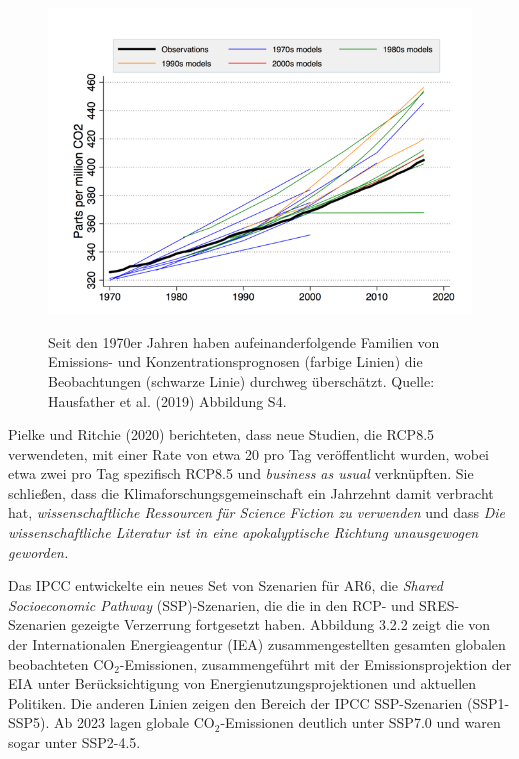 \documentclass[12pt,paper=a4,DIV=12,parskip=never,chapterprefix=false,headings=standardclasses]{scrreprt}
\numberwithin{figure}{chapter}
\begin{document}
\begin{figure}[H]
\begin{center}
\includegraphics[width=1.0\textwidth]{bilder/bilderKlima-0011.png}\\[1cm]
\end{center}
\caption{Seit den 1970er Jahren haben aufeinanderfolgende Familien von Emissions- und Konzentrationsprognosen (farbige
Linien) die Beobachtungen (schwarze Linie) durchweg überschätzt. Quelle: Hausfather et al. (2019)
Abbildung S4.}
\end{figure}

Pielke und Ritchie (2020) berichteten, dass neue Studien, die RCP8.5 verwendeten, mit einer Rate von etwa 20 pro Tag veröffentlicht wurden, wobei etwa zwei pro Tag spezifisch RCP8.5 und \emph{business as usual} verknüpften. Sie schließen, dass die Klimaforschungsgemeinschaft ein Jahrzehnt damit verbracht hat, \emph{wissenschaftliche Ressourcen für Science Fiction zu verwenden} und dass \emph{Die wissenschaftliche Literatur ist in eine apokalyptische Richtung unausgewogen geworden.}

Das IPCC entwickelte ein neues Set von Szenarien für AR6, die \emph{Shared Socioeconomic Pathway} (SSP)-Szenarien, die die in den RCP- und SRES-Szenarien gezeigte Verzerrung fortgesetzt haben. Abbildung 3.2.2 zeigt die von der Internationalen Energieagentur (IEA) zusammengestellten gesamten globalen beobachteten CO$_2$-Emissionen, zusammengeführt mit der Emissionsprojektion der EIA unter Berücksichtigung von Energienutzungsprojektionen und aktuellen Politiken. Die anderen Linien zeigen den Bereich der IPCC SSP-Szenarien (SSP1-SSP5). Ab 2023 lagen globale CO$_2$-Emissionen deutlich unter SSP7.0 und waren sogar unter SSP2-4.5.
\end{document}
